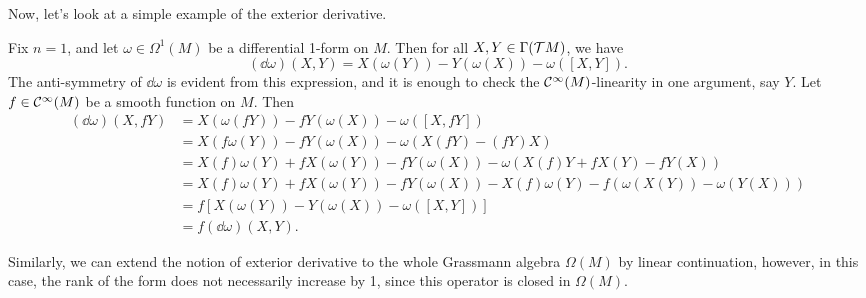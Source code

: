 Now, let's look at a simple example of the exterior derivative.
\begin{example}
    Fix \(n = 1\), and let \(\omega \in \Omega^1(M)\) be a differential 1-form on \(M\). Then for all \(X, Y \in \Gamma(\mathcal T M)\), we have
    \begin{equation*}
        (\dd \omega)(X, Y) = X(\omega(Y)) - Y(\omega(X)) - \omega([X, Y]).
    \end{equation*}
    The anti-symmetry of \(\dd \omega\) is evident from this expression, and it is enough to check the \(\mathcal C^\infty(M)\)-linearity in one argument, say \(Y\). Let \(f \in \mathcal C^\infty(M)\) be a smooth function on \(M\). Then
    \begin{align*}
        (\dd \omega)(X, f Y) & = X(\omega(f Y)) - f Y(\omega(X)) - \omega([X, f Y])                                                 \\
                             & = X(f \omega(Y)) - f Y(\omega(X)) - \omega(X(f Y) - (f Y) X)                                         \\
                             & = X(f) \omega(Y) + f X(\omega(Y)) - f Y(\omega(X)) - \omega(X(f) Y + f X(Y) - f Y(X))                \\
                             & = X(f) \omega(Y) + f X(\omega(Y)) - f Y(\omega(X)) - X(f) \omega(Y) - f(\omega(X(Y)) - \omega(Y(X))) \\
                             & = f [X(\omega(Y)) - Y(\omega(X)) - \omega([X, Y])]                                                   \\
                             & = f (\dd \omega)(X, Y).
    \end{align*}
\end{example}
Similarly, we can extend the notion of exterior derivative to the whole Grassmann algebra \(\Omega(M)\) by linear continuation, however, in this case, the rank of the form does not necessarily increase by 1, since this operator is closed in \(\Omega(M)\).


